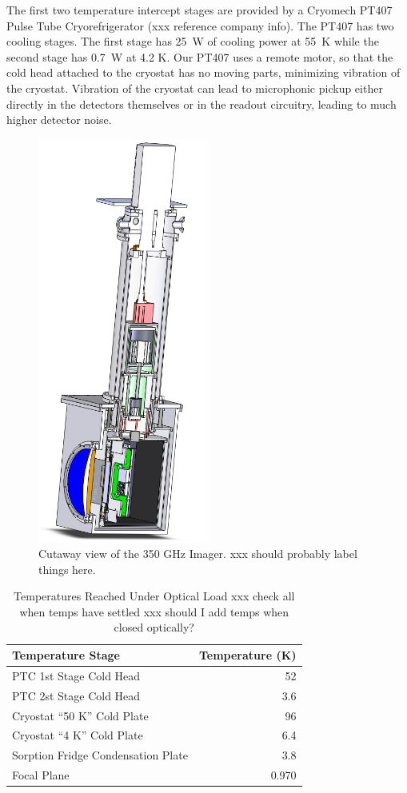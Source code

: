 \documentclass[10pt,twocolumn,article]{memoir} %
\begin{document}
The first two temperature intercept stages are provided by a Cryomech PT407 Pulse Tube Cryorefrigerator (xxx reference company info).
The PT407 has two cooling stages.
The first stage has 25~W of cooling power at 55~K while the second stage has 0.7~W at 4.2 K.
Our PT407 uses a remote motor, so that the cold head attached to the cryostat has no moving parts, minimizing vibration of the cryostat.
Vibration of the cryostat can lead to microphonic pickup either directly in the detectors themselves or in the readout circuitry, leading to much higher detector noise.

\begin{figure}[th]
\centering
\includegraphics[width=0.5\textwidth]{images/cryostat-cutaway.png}
\caption{Cutaway view of the 350 GHz Imager. xxx should probably label things here.}
\label{fig:cryo-cutaway}
\end{figure}

\begin{table}[ht]
\centering
\caption{Temperatures Reached Under Optical Load xxx check all when temps have settled xxx should I add temps when closed optically?}
\label{tab:temp-optical-load}
\begin{tabular}{l r}
\toprule
Temperature Stage &  Temperature (K)\\
\midrule
PTC 1st Stage Cold Head 			& 52 \\
PTC 2st Stage Cold Head 			& 3.6 \\
Cryostat ``50 K'' Cold Plate 		& 96 \\
Cryostat ``4 K'' Cold Plate 			& 6.4 \\
Sorption Fridge Condensation Plate 	& 3.8 \\
Focal Plane 						& 0.970 \\
\bottomrule
\end{tabular}
\end{table}
\end{document}
